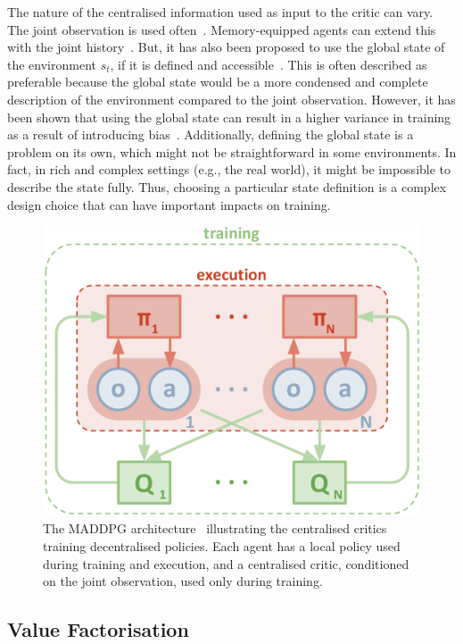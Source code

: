 The nature of the centralised information used as input to the critic can vary. The joint observation is used often~\citep{Lowe2017_MADDPG, Iqbal2019_MAAC}. Memory-equipped agents can extend this with the joint history~\citep{Foerster2018_COMA, Wang2020_RMADDPG, Yu2021_MAPPO}. But, it has also been proposed to use the global state of the environment $s_t$, if it is defined and accessible~\citep{Lowe2017_MADDPG, Foerster2018_COMA}. This is often described as preferable because the global state would be a more condensed and complete description of the environment compared to the joint observation. However, it has been shown that using the global state can result in a higher variance in training as a result of introducing bias~\citep{Lyu2023_CentralisedCritics}. Additionally, defining the global state is a problem on its own, which might not be straightforward in some environments. In fact, in rich and complex settings (e.g., the real world), it might be impossible to describe the state fully. Thus, choosing a particular state definition is a complex design choice that can have important impacts on training. 

\begin{figure}
    \centering
    \includegraphics[width=0.48\linewidth]{Figures/MADRL/maddpg.png}
    \caption{The MADDPG architecture~\citep{Lowe2017_MADDPG} illustrating the centralised critics training decentralised policies. Each agent has a local policy used during training and execution, and a centralised critic, conditioned on the joint observation, used only during training.}
    \label{fig:MADDPG}
\end{figure}




\subsection{Value Factorisation}\label{sec:MADRL:ValueFac}

